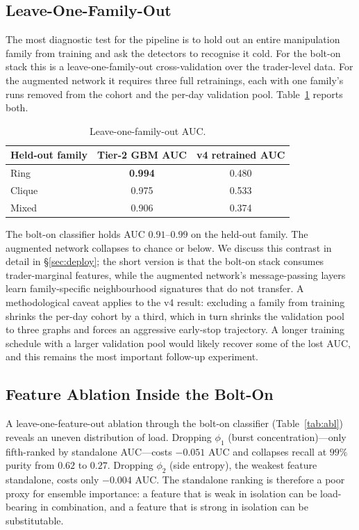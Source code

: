 \documentclass[10pt,twocolumn,letterpaper]{article}
\begin{document}
\subsection{Leave-One-Family-Out}
The most diagnostic test for the pipeline is to hold out an entire
manipulation family from training and ask the detectors to recognise
it cold. For the bolt-on stack this is a leave-one-family-out
cross-validation over the trader-level data. For the augmented
network it requires three full retrainings, each with one family's
runs removed from the cohort and the per-day validation pool.
Table~\ref{tab:family} reports both.

\begin{table}[t]
\caption{Leave-one-family-out AUC.}
\label{tab:family}
\centering
\footnotesize
\begin{tabular}{lcc}
\toprule
Held-out family & Tier-2 GBM AUC & v4 retrained AUC \\
\midrule
Ring & \textbf{0.994} & 0.480 \\
Clique & 0.975 & 0.533 \\
Mixed & 0.906 & 0.374 \\
\bottomrule
\end{tabular}
\end{table}

The bolt-on classifier holds AUC \(0.91\)--\(0.99\) on the held-out
family. The augmented network collapses to chance or below. We discuss
this contrast in detail in \S\ref{sec:deploy}; the short version is
that the bolt-on stack consumes trader-marginal features, while the
augmented network's message-passing layers learn family-specific
neighbourhood signatures that do not transfer. A methodological caveat
applies to the v4 result: excluding a family from training shrinks the
per-day cohort by a third, which in turn shrinks the validation pool to
three graphs and forces an aggressive early-stop trajectory. A longer
training schedule with a larger validation pool would likely recover
some of the lost AUC, and this remains the most important follow-up
experiment.


\subsection{Feature Ablation Inside the Bolt-On}
\label{sec:abl}
A leave-one-feature-out ablation through the bolt-on classifier
(Table~\ref{tab:abl}) reveals an uneven distribution of load. Dropping
\(\phi_1\) (burst concentration)---only fifth-ranked by standalone
AUC---costs \(-0.051\) AUC and collapses recall at \(99\%\) purity
from \(0.62\) to \(0.27\). Dropping \(\phi_2\) (side entropy), the
weakest feature standalone, costs only \(-0.004\) AUC. The standalone
ranking is therefore a poor proxy for ensemble importance: a feature
that is weak in isolation can be load-bearing in combination, and a
feature that is strong in isolation can be substitutable.
\end{document}
